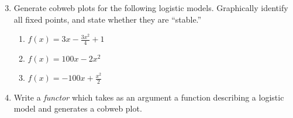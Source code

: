 \documentclass[10pt,letterpaper]{article}
\begin{document}
%
      
\begin{enumerate}
  \setcounter{enumi}{2}
  \item Generate cobweb plots for the following logistic models.  Graphically identify all fixed points, and state whether they are ``stable.''
  \begin{enumerate}
    \item $f(x) = 3x - \frac{3x^2}{4} + 1$
    \item $f(x) = 100x -2x^2$
    \item $f(x) = -100 x + \frac{x^2}{2}$
  \end{enumerate}
  \item Write a \emph{functor} which takes as an argument a function describing a logistic model and generates a cobweb plot.
\end{enumerate}
\end{document}
